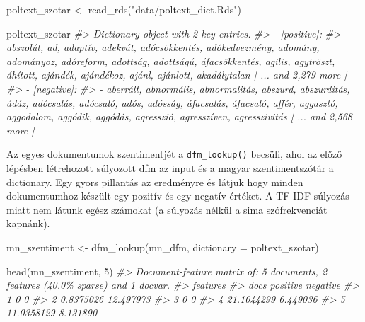 \documentclass[
]{book}
\newenvironment{Shaded}{\begin{snugshade}}{\end{snugshade}}
\newcommand{\AttributeTok}[1]{\textcolor[rgb]{0.77,0.63,0.00}{#1}}
\newcommand{\CommentTok}[1]{\textcolor[rgb]{0.56,0.35,0.01}{\textit{#1}}}
\newcommand{\DecValTok}[1]{\textcolor[rgb]{0.00,0.00,0.81}{#1}}
\newcommand{\FunctionTok}[1]{\textcolor[rgb]{0.00,0.00,0.00}{#1}}
\newcommand{\NormalTok}[1]{#1}
\newcommand{\OtherTok}[1]{\textcolor[rgb]{0.56,0.35,0.01}{#1}}
\newcommand{\StringTok}[1]{\textcolor[rgb]{0.31,0.60,0.02}{#1}}
\begin{document}
\begin{Shaded}
\begin{Highlighting}[]
\NormalTok{poltext\_szotar }\OtherTok{\textless{}{-}} \FunctionTok{read\_rds}\NormalTok{(}\StringTok{"data/poltext\_dict.Rds"}\NormalTok{)}
\end{Highlighting}
\end{Shaded}

\begin{Shaded}
\begin{Highlighting}[]
\NormalTok{poltext\_szotar}
\CommentTok{\#\textgreater{} Dictionary object with 2 key entries.}
\CommentTok{\#\textgreater{} {-} [positive]:}
\CommentTok{\#\textgreater{}   {-} abszolút, ad, adaptív, adekvát, adócsökkentés, adókedvezmény, adomány, adományoz, adóreform, adottság, adottságú, áfacsökkentés, agilis, agytröszt, áhított, ajándék, ajándékoz, ajánl, ajánlott, akadálytalan [ ... and 2,279 more ]}
\CommentTok{\#\textgreater{} {-} [negative]:}
\CommentTok{\#\textgreater{}   {-} aberrált, abnormális, abnormalitás, abszurd, abszurditás, ádáz, adócsalás, adócsaló, adós, adósság, áfacsalás, áfacsaló, affér, aggasztó, aggodalom, aggódik, aggódás, agresszió, agresszíven, agresszivitás [ ... and 2,568 more ]}
\end{Highlighting}
\end{Shaded}

Az egyes dokumentumok szentimentjét a \texttt{dfm\_lookup()} becsüli,
ahol az előző lépésben létrehozott súlyozott dfm az input és a magyar
szentimentszótár a dictionary. Egy gyors pillantás az eredményre és
látjuk hogy minden dokumentumhoz készült egy pozitív és egy negatív
értéket. A TF-IDF súlyozás miatt nem látunk egész számokat (a súlyozás
nélkül a sima szófrekvenciát kapnánk).

\begin{Shaded}
\begin{Highlighting}[]
\NormalTok{mn\_szentiment }\OtherTok{\textless{}{-}} \FunctionTok{dfm\_lookup}\NormalTok{(mn\_dfm, }\AttributeTok{dictionary =}\NormalTok{ poltext\_szotar)}

\FunctionTok{head}\NormalTok{(mn\_szentiment, }\DecValTok{5}\NormalTok{)}
\CommentTok{\#\textgreater{} Document{-}feature matrix of: 5 documents, 2 features (40.0\% sparse) and 1 docvar.}
\CommentTok{\#\textgreater{}     features}
\CommentTok{\#\textgreater{} docs   positive  negative}
\CommentTok{\#\textgreater{}    1  0          0       }
\CommentTok{\#\textgreater{}    2  0.8375026 12.497973}
\CommentTok{\#\textgreater{}    3  0          0       }
\CommentTok{\#\textgreater{}    4 21.1044299  6.449036}
\CommentTok{\#\textgreater{}    5 11.0358129  8.131890}
\end{Highlighting}
\end{Shaded}
\end{document}

